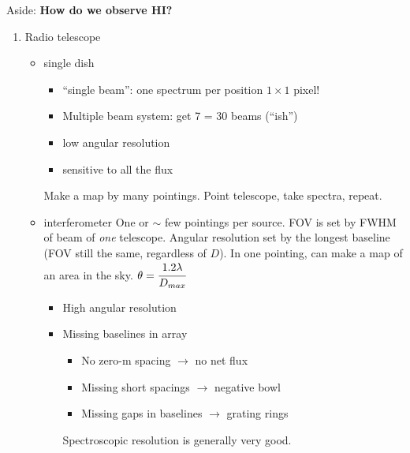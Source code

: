 \documentclass[11pt]{article}
\begin{document}
\begin{framed}
    Aside: \textbf{How do we observe HI?}
    \begin{enumerate}
        \item Radio telescope
            \begin{itemize}
                \item single dish
                    \begin{itemize}
                        \item ``single beam'': one spectrum per position
                            $1\times1$ pixel!
                        \item Multiple beam system: get 7 = 30 beams (``ish'')
                        \item low angular resolution
                        \item sensitive to all the flux
                    \end{itemize}
                    Make a map by many pointings. Point telescope, take spectra,
                    repeat.
                \item interferometer
                One or $\sim$ few pointings per source. FOV is set by FWHM of beam
                of \emph{one} telescope. Angular resolution set by the longest
                baseline (FOV still the same, regardless of $D$). In one pointing,
                can make a map of an area in the sky. $\theta = \cfrac{1.2\lambda}{D_{max}}$
                \begin{itemize}
                    \item High angular resolution
                    \item Missing baselines in array
                        \begin{itemize}
                            \item No zero-m spacing $\rightarrow$ no net flux
                            \item Missing short spacings $\rightarrow$ negative bowl
                            \item Missing gaps in baselines $\rightarrow$ grating rings
                        \end{itemize}
                        Spectroscopic resolution is generally very good.
                \end{itemize}
            \end{itemize}
    \end{enumerate}
\end{framed}
\end{document}
